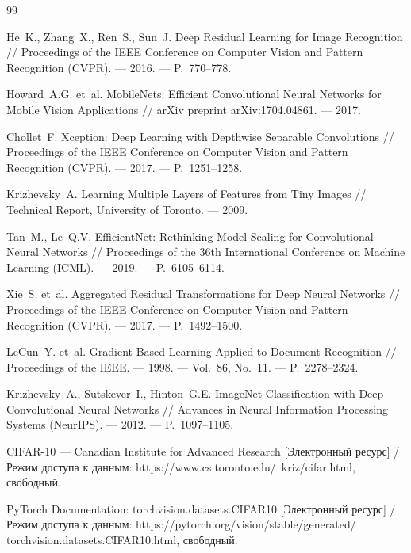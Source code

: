 \newpage
\renewcommand{\refname}{Список использованных источников}
\begin{thebibliography}{99}
    \setlength{\itemindent}{\parindent}
    \begin{sloppypar}
         He~K., Zhang~X., Ren~S., Sun~J. Deep Residual Learning for Image Recognition //
            Proceedings of the IEEE Conference on Computer Vision and Pattern Recognition
            (CVPR). — 2016. — P.~770--778.

         Howard~A.G. et~al. MobileNets: Efficient Convolutional Neural Networks for
            Mobile Vision Applications // arXiv preprint arXiv:1704.04861. — 2017.

         Chollet~F. Xception: Deep Learning with Depthwise Separable Convolutions //
            Proceedings of the IEEE Conference on Computer Vision and Pattern Recognition
            (CVPR). — 2017. — P.~1251--1258.

         Krizhevsky~A. Learning Multiple Layers of Features from Tiny Images //
            Technical Report, University of Toronto. — 2009.

         Tan~M., Le~Q.V. EfficientNet: Rethinking Model Scaling for Convolutional
            Neural Networks // Proceedings of the 36th International Conference on Machine
            Learning (ICML). — 2019. — P.~6105--6114.

         Xie~S. et~al. Aggregated Residual Transformations for Deep Neural Networks //
            Proceedings of the IEEE Conference on Computer Vision and Pattern Recognition
            (CVPR). — 2017. — P.~1492--1500.

         LeCun~Y. et~al. Gradient-Based Learning Applied to Document Recognition //
            Proceedings of the IEEE. — 1998. — Vol.~86, No.~11. — P.~2278--2324.

         Krizhevsky~A., Sutskever~I., Hinton~G.E. ImageNet Classification with Deep
            Convolutional Neural Networks // Advances in Neural Information Processing
            Systems (NeurIPS). — 2012. — P.~1097--1105.

        \item CIFAR-10 — Canadian Institute for Advanced Research [Электронный ресурс] /
            Режим доступа к данным: https://www.cs.toronto.edu/~kriz/cifar.html,
            свободный.

        \item PyTorch Documentation: torchvision.datasets.CIFAR10 [Электронный ресурс] /
            Режим доступа к данным: https://pytorch.org/vision/stable/generated/
            torchvision.datasets.CIFAR10.html, свободный.
    \end{sloppypar}
\end{thebibliography}

